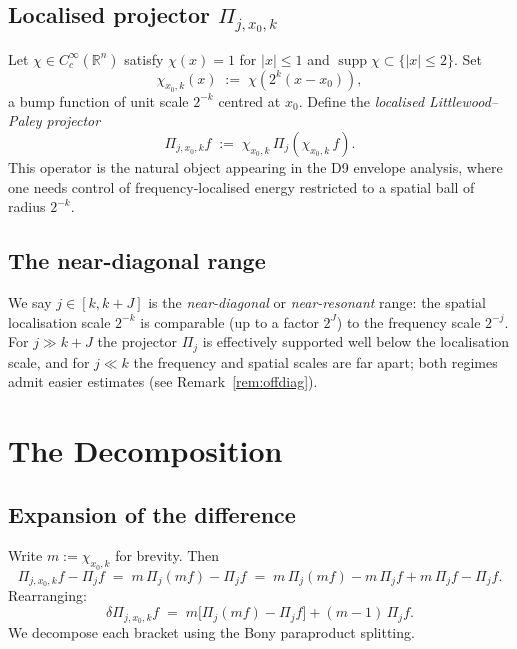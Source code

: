 \documentclass[11pt,a4paper]{article}
\newcommand{\R}{\mathbb{R}}
\newcommand{\supp}{\operatorname{supp}}
\begin{document}
\subsection{Localised projector $\Pi_{j,x_0,k}$}

Let $\chi \in C^\infty_c(\R^n)$ satisfy $\chi(x) = 1$ for $|x| \leq 1$
and $\supp\chi \subset \{|x| \leq 2\}$.  Set
\[
  \chi_{x_0,k}(x) \;:=\; \chi\!\left(2^k(x - x_0)\right),
\]
a bump function of unit scale $2^{-k}$ centred at $x_0$.
Define the \emph{localised Littlewood--Paley projector}
\[
  \Pi_{j,x_0,k} f \;:=\; \chi_{x_0,k}\,\Pi_j(\chi_{x_0,k}\,f).
\]
This operator is the natural object appearing in the D9 envelope analysis,
where one needs control of frequency-localised energy restricted to a spatial
ball of radius $2^{-k}$.

\subsection{The near-diagonal range}

We say $j \in [k, k+J]$ is the \emph{near-diagonal} or
\emph{near-resonant} range: the spatial localisation scale $2^{-k}$ is
comparable (up to a factor $2^J$) to the frequency scale $2^{-j}$.
For $j \gg k+J$ the projector $\Pi_j$ is effectively supported well below
the localisation scale, and for $j \ll k$ the frequency and spatial scales
are far apart; both regimes admit easier estimates (see Remark~\ref{rem:offdiag}).

\section{The Decomposition}
\label{sec:decomp}

\subsection{Expansion of the difference}

Write $m := \chi_{x_0,k}$ for brevity.  Then
\[
  \Pi_{j,x_0,k} f - \Pi_j f
  \;=\; m\,\Pi_j(mf) - \Pi_j f
  \;=\; m\,\Pi_j(mf) - m\,\Pi_j f + m\,\Pi_j f - \Pi_j f.
\]
Rearranging:
\begin{equation}
  \label{eq:firstsplit}
  \delta\Pi_{j,x_0,k} f
  \;=\; m\bigl[\Pi_j(mf) - \Pi_j f\bigr]
        + (m-1)\,\Pi_j f.
\end{equation}
We decompose each bracket using the Bony paraproduct splitting.
\end{document}
